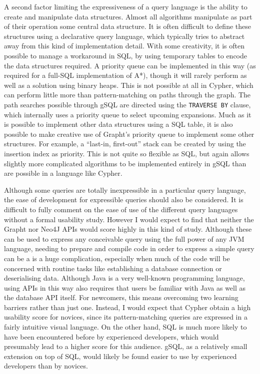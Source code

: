 A second factor limiting the expressiveness of a query language is the ability to create and manipulate data structures. Almost all
algorithms manipulate as part of their operation some central data
structure. It is often difficult to define these structures using  a
declarative query language, which typically tries to abstract away from this kind of
implementation detail.
With some creativity, it is often possible to manage a workaround in SQL, by
using temporary tables to encode the data structures required. A priority
queue can be implemented in this way (as required for a full-SQL
implementation of A*), though it will rarely perform as well as a solution
using binary heaps. This is not possible at all in Cypher, which can perform
little  more than pattern-matching on paths through the graph. The path
searches possible through gSQL are directed using the \texttt{TRAVERSE BY}
clause, which internally uses a priority queue to select upcoming expansions.
Much as it is possible to implement other data structures using a SQL table,
it is also possible to make creative use of Grapht's priority queue to
implement some other structures. For example, a ``last-in, first-out'' stack
can be created by using the insertion index as priority. This is not quite so
flexible as SQL, but again allows slightly more complicated algorithms to be
implemented entirely in gSQL than are possible in a language like Cypher.

Although some queries are totally inexpressible in a particular query
language, the ease of development for expressible queries should also be
considered. It is difficult to fully comment on the ease of use of the
different query languages without a formal usability study. However I would
expect to find that neither the Grapht nor Neo4J APIs would score highly in
this kind of study. Although these can be used to express any conceivable
query using the full power of any JVM language, needing to prepare and compile
code in order to express a simple query can be a is a huge complication,
especially when much of the code will be concerned with routine tasks like
establishing a database connection or deserialising data. Although Java is a
very well-known programming language, using APIs in this way also requires
that users be familiar with Java as well as the database API itself. For
newcomers, this means overcoming two learning barriers rather than just one.
Instead, I would expect that Cypher obtain a high usability score for novices,
since its pattern-matching queries are expressed in a fairly intuitive visual
language. On the other hand, SQL is much  more likely to have been encountered
before by experienced developers, which would presumably lead to a higher
score for this audience. gSQL, as a relatively small extension on top of SQL, would likely be
found easier to use by experienced developers than by novices.


